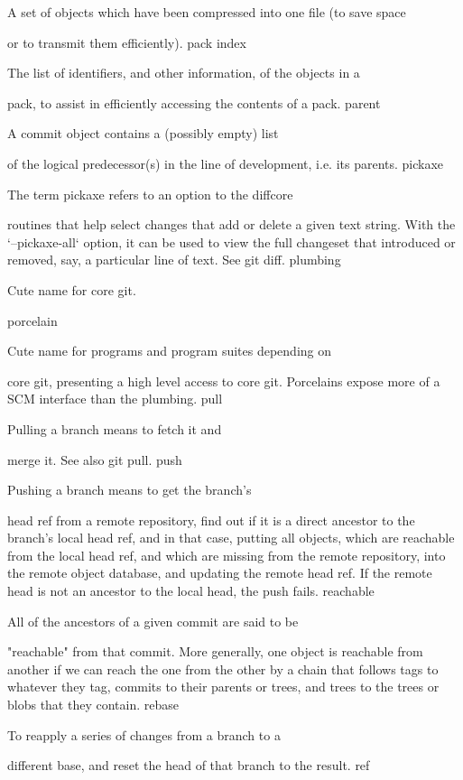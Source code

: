 A set of objects which have been compressed into one file (to save space

or to transmit them efficiently).
pack index

The list of identifiers, and other information, of the objects in a

pack, to assist in efficiently accessing the contents of a
pack.
parent

A commit object contains a (possibly empty) list

of the logical predecessor(s) in the line of development, i.e. its
parents.
pickaxe

The term pickaxe refers to an option to the diffcore

routines that help select changes that add or delete a given text
string. With the `--pickaxe-all` option, it can be used to view the full
changeset that introduced or removed, say, a
particular line of text. See git diff.
plumbing

Cute name for core git.

porcelain

Cute name for programs and program suites depending on

core git, presenting a high level access to
core git. Porcelains expose more of a SCM
interface than the plumbing.
pull

Pulling a branch means to fetch it and

merge it.  See also git pull.
push

Pushing a branch means to get the branch's

head ref from a remote repository,
find out if it is a direct ancestor to the branch's local
head ref, and in that case, putting all
objects, which are reachable from the local
head ref, and which are missing from the remote
repository, into the remote
object database, and updating the remote
head ref. If the remote head is not an
ancestor to the local head, the push fails.
reachable

All of the ancestors of a given commit are said to be

"reachable" from that commit. More
generally, one object is reachable from
another if we can reach the one from the other by a chain
that follows tags to whatever they tag,
commits to their parents or trees, and
trees to the trees or blobs
that they contain.
rebase

To reapply a series of changes from a branch to a

different base, and reset the head of that branch
to the result.
ref

